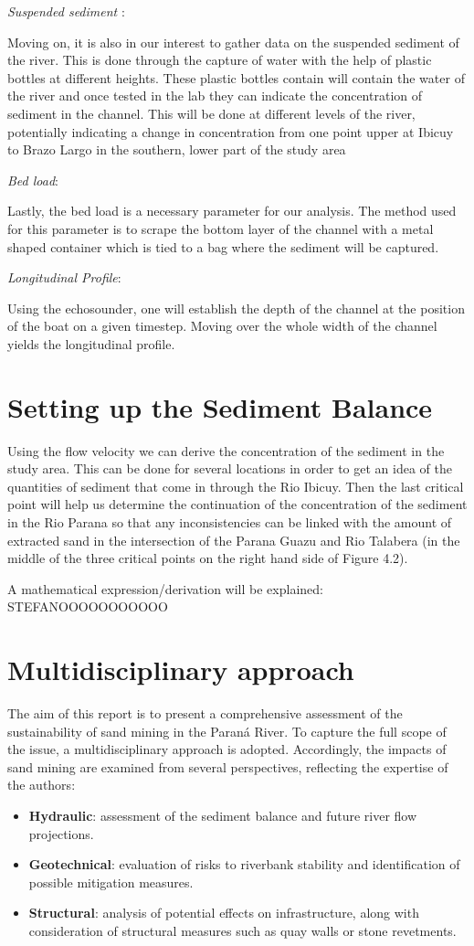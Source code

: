 \textit{Suspended sediment }:

Moving on, it is also in our interest to gather data on the suspended sediment of the river. This is done through the capture of water with the help of plastic bottles at different heights. These plastic bottles contain will contain the water of the river and once tested in the lab they can indicate the concentration of sediment in the channel. This will be done at different levels of the river, potentially indicating a change in concentration from one point upper at Ibicuy to Brazo Largo in the southern, lower part of the study area

\textit{Bed load}:

Lastly, the bed load is a necessary parameter for our analysis. The method used for this parameter is to scrape the bottom layer of the channel with a metal shaped container which is tied to a bag where the sediment will be captured.

\textit{Longitudinal Profile}:

Using the echosounder, one will establish the depth of the channel at the position of the boat on a given timestep. Moving over the whole width of the channel yields the longitudinal profile. 

\section{Setting up the Sediment Balance}
Using the flow velocity we can derive the concentration of the sediment in the study area. This can be done for several locations in order to get an idea of the quantities of sediment that come in through the Rio Ibicuy. Then the last critical point will help us determine the continuation of the concentration of the sediment in the Rio Parana so that any inconsistencies can be linked with the amount of extracted sand in the intersection of the Parana Guazu and Rio Talabera (in the middle of the three critical points on the right hand side of Figure 4.2).

A mathematical expression/derivation will be explained:
STEFANOOOOOOOOOOO

\section{Multidisciplinary approach}
The aim of this report is to present a comprehensive assessment of the sustainability of sand mining in the Paraná River. To capture the full scope of the issue, a multidisciplinary approach is adopted. Accordingly, the impacts of sand mining are examined from several perspectives, reflecting the expertise of the authors:

\begin{itemize}
    \item \textbf{Hydraulic}: assessment of the sediment balance and future river flow projections.
    \item \textbf{Geotechnical}: evaluation of risks to riverbank stability and identification of possible mitigation measures.
    \item \textbf{Structural}: analysis of potential effects on infrastructure, along with consideration of structural measures such as quay walls or stone revetments.
\end{itemize}